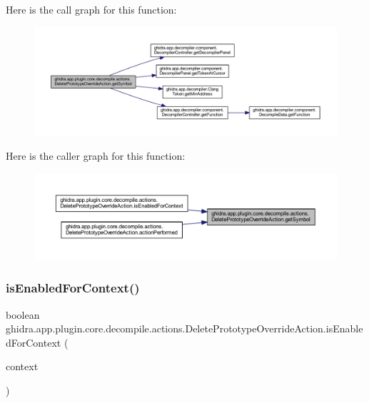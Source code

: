 Here is the call graph for this function\+:
\nopagebreak
\begin{figure}[H]
\begin{center}
\leavevmode
\includegraphics[width=350pt]{classghidra_1_1app_1_1plugin_1_1core_1_1decompile_1_1actions_1_1_delete_prototype_override_action_ada33281811697903f0a753abc6353937_cgraph}
\end{center}
\end{figure}
Here is the caller graph for this function\+:
\nopagebreak
\begin{figure}[H]
\begin{center}
\leavevmode
\includegraphics[width=350pt]{classghidra_1_1app_1_1plugin_1_1core_1_1decompile_1_1actions_1_1_delete_prototype_override_action_ada33281811697903f0a753abc6353937_icgraph}
\end{center}
\end{figure}
\mbox{\label{classghidra_1_1app_1_1plugin_1_1core_1_1decompile_1_1actions_1_1_delete_prototype_override_action_a1ded5df0bab8251adaf5d6e19e5adedb}} 
\subsubsection{\texorpdfstring{isEnabledForContext()}{isEnabledForContext()}}
{\footnotesize\ttfamily boolean ghidra.\+app.\+plugin.\+core.\+decompile.\+actions.\+Delete\+Prototype\+Override\+Action.\+is\+Enabled\+For\+Context (\begin{DoxyParamCaption}\item[{Action\+Context}]{context }\end{DoxyParamCaption})\hspace{0.3cm}{\ttfamily [inline]}}



